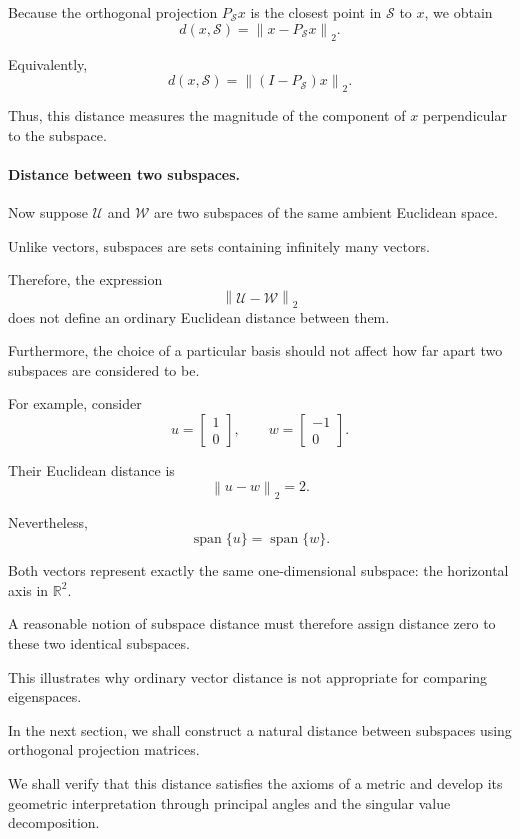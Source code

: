 \documentclass[14pt,letterpaper]{article}
\theoremstyle{plain}
\theoremstyle{definition}
\theoremstyle{remark}
\newcommand{\R}{\mathbb{R}}
\newcommand{\norm}[1]{\left\lVert #1 \right\rVert}
\DeclareMathOperator{\Span}{span}
\begin{document}
Because the orthogonal projection
$P_{\mathcal S}x$ is the closest point
in $\mathcal S$ to $x$, we obtain
\[
\boxed{
d(x,\mathcal S)
=
\norm{x-P_{\mathcal S}x}_2.
}
\]

Equivalently,
\[
\boxed{
d(x,\mathcal S)
=
\norm{(I-P_{\mathcal S})x}_2.
}
\]

Thus, this distance measures the magnitude
of the component of $x$ perpendicular
to the subspace.

\paragraph{Distance between two subspaces.}

Now suppose $\mathcal U$ and $\mathcal W$
are two subspaces of the same ambient
Euclidean space.

Unlike vectors, subspaces are sets
containing infinitely many vectors.

Therefore, the expression
\[
\norm{\mathcal U-\mathcal W}_2
\]
does not define an ordinary Euclidean
distance between them.

Furthermore, the choice of a particular
basis should not affect how far apart
two subspaces are considered to be.

For example, consider
\[
u=
\begin{bmatrix}
1\\0
\end{bmatrix},
\qquad
w=
\begin{bmatrix}
-1\\0
\end{bmatrix}.
\]

Their Euclidean distance is
\[
\norm{u-w}_2=2.
\]

Nevertheless,
\[
\boxed{
\Span\{u\}=\Span\{w\}.
}
\]

Both vectors represent exactly the same
one-dimensional subspace: the horizontal
axis in $\R^2$.

A reasonable notion of subspace distance
must therefore assign distance zero
to these two identical subspaces.

This illustrates why ordinary vector
distance is not appropriate for
comparing eigenspaces.

In the next section, we shall construct
a natural distance between subspaces
using orthogonal projection matrices.

We shall verify that this distance
satisfies the axioms of a metric and
develop its geometric interpretation
through principal angles and the
singular value decomposition.
\end{document}
